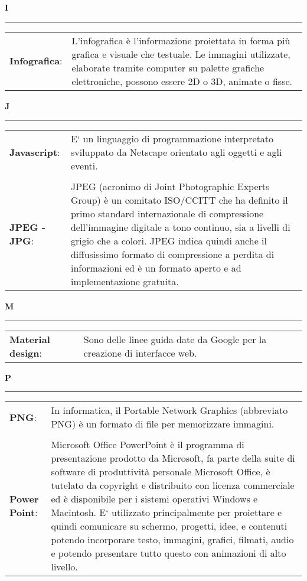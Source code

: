 	\hfill\Huge{\textbf{I}}\\
\rule{16cm}{.6pt}
\normalsize
	\begin{longtable}{p{} p{}} 
	    \\
		    \textbf{Infografica}: & L'infografica è l'informazione proiettata in forma più grafica e visuale che testuale. Le immagini utilizzate, elaborate tramite computer su palette grafiche elettroniche, possono essere 2D o 3D, animate o fisse.
	\end{longtable}
	
	
\hfill\Huge{\textbf{J}}\\
\rule{16cm}{.6pt}
\normalsize
	\begin{longtable}{p{} p{}} 
	    \\
		    \textbf{Javascript}: & E` un linguaggio di programmazione interpretato sviluppato da Netscape orientato agli oggetti e agli eventi.\\
		    \\
		    \textbf{JPEG - JPG}: & JPEG (acronimo di Joint Photographic Experts Group) è un comitato ISO/CCITT che ha definito il primo standard internazionale di compressione dell'immagine digitale a tono continuo, sia a livelli di grigio che a colori. JPEG indica quindi anche il diffusissimo formato di compressione a perdita di informazioni ed è un formato aperto e ad implementazione gratuita.
	\end{longtable}
	
	
	\hfill\Huge{\textbf{M}}\\
\rule{16cm}{.6pt}
\normalsize
	\begin{longtable}{p{} p{}} 
	    \\
		    \textbf{Material design}: & Sono delle linee guida date da Google per la creazione di interfacce web.	\\
	\end{longtable}
	
	
	\hfill\Huge{\textbf{P}}\\
\rule{16cm}{.6pt}
\normalsize
	\begin{longtable}{p{} p{}} 
	    \\
		    \textbf{PNG}: & In informatica, il Portable Network Graphics (abbreviato PNG) è un formato di file per memorizzare immagini.\\
		    \\
		    \textbf{Power Point}: & Microsoft Office PowerPoint è il programma di presentazione prodotto da Microsoft, fa parte della suite di software di produttività personale Microsoft Office, è tutelato da copyright e distribuito con licenza commerciale ed è disponibile per i sistemi operativi Windows e Macintosh. E` utilizzato principalmente per proiettare e quindi comunicare su schermo, progetti, idee, e contenuti potendo incorporare testo, immagini, grafici, filmati, audio e potendo presentare tutto questo con animazioni di alto livello.\\
	\end{longtable}
	
